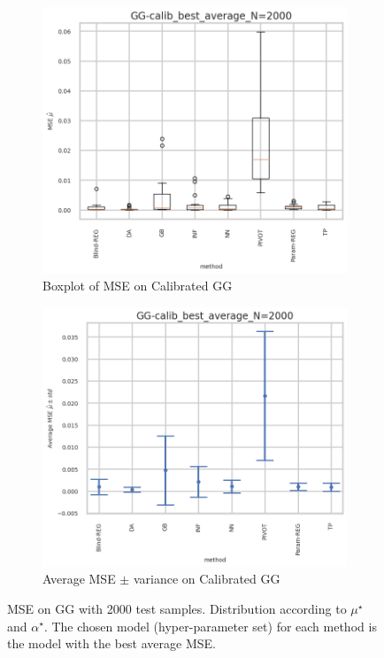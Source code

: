 \begin{figure}[ht!]
  \begin{subfigure}[t]{0.49\linewidth}
    \includegraphics[width=\linewidth]{COMPARE/GG-calib/BEST_MSE/GG-calib_best_average_N=2000-boxplot_mse.png}
    \caption{Boxplot of MSE on Calibrated GG}
  \end{subfigure}%
  \hfill
  \begin{subfigure}[t]{0.49\linewidth}
    \includegraphics[width=\linewidth]{COMPARE/GG-calib/BEST_MSE/GG-calib_best_average_N=2000-errplot_mse.png}
    \caption{Average MSE $\pm$ variance on Calibrated GG}
  \end{subfigure}

  \caption{MSE on GG with 2000 test samples. Distribution according to $\mu^\star$ and $\alpha^\star$. The chosen model (hyper-parameter set) for each method is the model with the best average MSE.}
  \label{fig:compare_gg_best_mse}
\end{figure}

